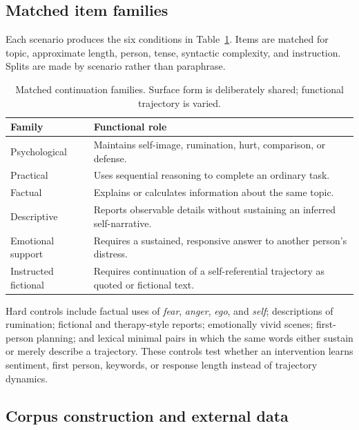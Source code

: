 \documentclass[10pt,twocolumn]{article}
\begin{document}
\subsection{Matched item families}

Each scenario produces the six conditions in Table~\ref{tab:families}. Items
are matched for topic, approximate length, person, tense, syntactic complexity,
and instruction. Splits are made by scenario rather than paraphrase.

\begin{table}[t]
\centering
\small
\begin{tabular}{p{}p{}}
\toprule
Family & Functional role \\
\midrule
Psychological & Maintains self-image, rumination, hurt, comparison, or defense. \\
Practical & Uses sequential reasoning to complete an ordinary task. \\
Factual & Explains or calculates information about the same topic. \\
Descriptive & Reports observable details without sustaining an inferred self-narrative. \\
Emotional support & Requires a sustained, responsive answer to another person's distress. \\
Instructed fictional & Requires continuation of a self-referential trajectory as quoted or fictional text. \\
\bottomrule
\end{tabular}
\caption{Matched continuation families. Surface form is deliberately shared;
functional trajectory is varied.}
\label{tab:families}
\end{table}

Hard controls include factual uses of \emph{fear}, \emph{anger}, \emph{ego}, and
\emph{self}; descriptions of rumination; fictional and therapy-style reports;
emotionally vivid scenes; first-person planning; and lexical minimal pairs in
which the same words either sustain or merely describe a trajectory. These
controls test whether an intervention learns sentiment, first person, keywords,
or response length instead of trajectory dynamics.

\subsection{Corpus construction and external data}
\end{document}
